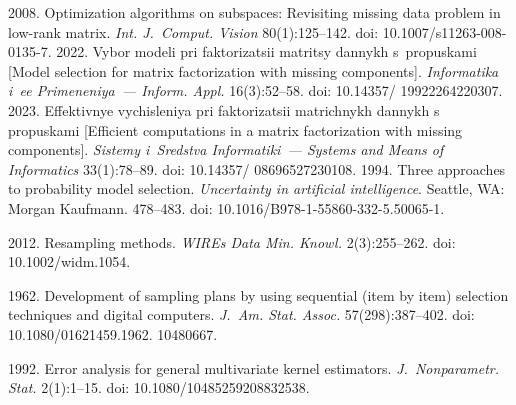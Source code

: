 


 
\vspace*{6pt}

  \begin{multicols}{2}

\renewcommand{\bibname}{\protect\rmfamily References}

{\small\frenchspacing
 {%
 \begin{thebibliography}{9}
 2008. Optimization algorithms on subspaces: Revisiting missing data 
problem in low-rank matrix. \textit{Int. J.~Comput. Vision} 80(1):125--142. doi: 
10.1007/s11263-008-0135-7.
 2022. Vybor modeli pri faktorizatsii mat\-ri\-tsy dannykh 
s~propuskami [Model selection for matrix factorization with missing components]. 
\textit{Informatika i~ee Primeneniya~--- Inform. Appl.} 16(3):52--58. doi: 
10.14357/ 19922264220307.
 2023. Effektivnye vychisleniya pri faktorizatsii matrichnykh 
dannykh s propuskami [Efficient computations in a matrix factorization with missing 
components]. \textit{Sistemy i~Sredstva Informatiki~--- Systems and Means of 
Informatics} 33(1):78--89. doi: 10.14357/ 08696527230108.
 1994. Three approaches to probability 
model selection. \textit{Uncertainty in artificial intelligence}.
Seattle, WA: Morgan Kaufmann. 478--483. doi: 10.1016/B978-1-55860-332-5.50065-1.

\vspace*{2pt}

 2012. Resampling methods. \textit{WIREs Data Min. 
Knowl.} 2(3):255--262. doi: 10.1002/widm.1054.

\vspace*{2pt}

 1962. Development of sampling 
plans by using sequential (item by item) selection techniques and digital computers. 
\textit{J.~Am. Stat. Assoc.} 57(298):387--402. doi: 
10.1080/01621459.1962. 10480667.

\vspace*{2pt}

 1992. Error analysis for general multivariate kernel estimators. 
\textit{J.~Nonparametr. Stat.} 2(1):1--15. doi: 10.1080/10485259208832538.
\end{thebibliography}

 }
 }

\end{multicols}

